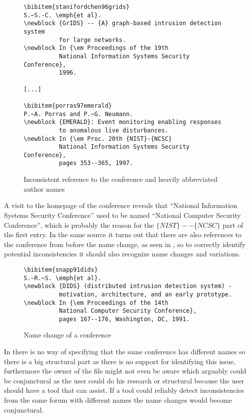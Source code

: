 \begin{figure}
  \centering
\begin{small}
\begin{verbatim}
\bibitem{stanifordchen96grids}
S.~S.-C. \emph{et al}.
\newblock {GrIDS} -- {A} graph-based intrusion detection system 
          for large networks.
\newblock In {\em Proceedings of the 19th
          National Information Systems Security Conference},
          1996.

[...]

\bibitem{porras97emerald}
P.~A. Porras and P.~G. Neumann.
\newblock {EMERALD}: Event monitoring enabling responses 
          to anomalous live disturbances.
\newblock In {\em Proc. 20th {NIST}-{NCSC}
          National Information Systems Security Conference},
          pages 353--365, 1997.

\end{verbatim}
\end{small}
  \caption{Inconsistent reference to the conference and heavily abbreviated author names}
\label{fig:entry_journal_name_authors}
\end{figure}

A visit to the homepage of the conference reveals that ``National
Information Systems Security Conference'' used to be named ``National
Computer Security Conference'', which is probably the reason for the
$\{NIST\}--\{NCSC\}$ part of the first entry\cite{nist2014_nissc}.  In
the same source it turns out that there are also references to the
conference from before the name change, as seen in
, so to correctly identify potential
inconsistencies it should also recognize name changes and variations.

\begin{figure}
  \centering
\begin{small}
\begin{verbatim}
\bibitem{snapp91dids}
S.~R.~S. \emph{et al}.
\newblock {DIDS} (distributed intrusion detection system) -
          motivation, architecture, and an early prototype.
\newblock In {\em Proceedings of the 14th
          National Computer Security Conference},
          pages 167--176, Washington, DC, 1991.
\end{verbatim}
\end{small}
  \caption{Name change of a conference}
\label{fig:conference_name}
\end{figure}

In {\bibtex} there is no way of specifying that the same conference
has different names so there is a big structural part as there is no
support for identifying this issue, furthermore the owner of the
{\bibtex} file might not even be aware which arguably could be
conjunctural as the user could do his research or structural because
the user should have a tool that can assist.  If a tool could reliably
detect inconsistencies from the same forum with different names the
name changes would become conjunctural.



